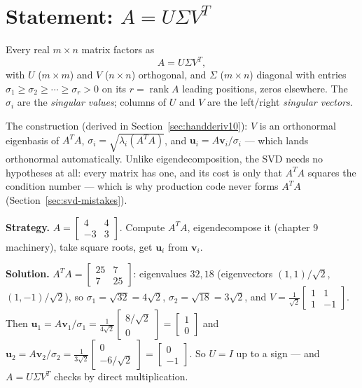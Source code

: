 \section{Statement: \texorpdfstring{$A=U\Sigma V^{T}$}{A=USV^T}}\label{sec:svd-statement}

\begin{theorem}
Every real $m\times n$ matrix factors as
\[
A=U\Sigma V^{T},
\]
with $U$ ($m\times m$) and $V$ ($n\times n$) orthogonal, and $\Sigma$
($m\times n$) diagonal with entries
$\sigma_1\ge\sigma_2\ge\cdots\ge\sigma_r>0$ on its $r=\operatorname{rank}A$
leading positions, zeros elsewhere. The $\sigma_i$ are the
\emph{singular values}; columns of $U$ and $V$ are
the left/right \emph{singular vectors}.
\end{theorem}

The construction (derived in Section~\ref{sec:handderiv10}): $V$ is an
orthonormal eigenbasis of $A^{T}A$, $\sigma_i=\sqrt{\lambda_i(A^{T}A)}$,
and $\mathbf u_i=A\mathbf v_i/\sigma_i$ --- which lands orthonormal
automatically. Unlike eigendecomposition, the SVD needs no hypotheses at
all: every matrix has one, and its cost is only that $A^{T}A$ squares the
condition number --- which is why production code never forms $A^{T}A$
(Section~\ref{sec:svd-mistakes}).

\begin{example}\label{ex:svd2}
\textbf{Strategy.} $A=\begin{bmatrix}4&4\\-3&3\end{bmatrix}$. Compute
$A^{T}A$, eigendecompose it (chapter 9 machinery), take square roots,
get $\mathbf u_i$ from $\mathbf v_i$.

\textbf{Solution.}
$A^{T}A=\begin{bmatrix}25&7\\7&25\end{bmatrix}$: eigenvalues $32,18$
(eigenvectors $(1,1)/\sqrt2$, $(1,-1)/\sqrt2$), so
$\sigma_1=\sqrt{32}=4\sqrt2$, $\sigma_2=\sqrt{18}=3\sqrt2$, and
$V=\frac1{\sqrt2}\begin{bmatrix}1&1\\1&-1\end{bmatrix}$. Then
$\mathbf u_1=A\mathbf v_1/\sigma_1
=\frac{1}{4\sqrt2}\begin{bmatrix}8/\sqrt2\\0\end{bmatrix}
=\begin{bmatrix}1\\0\end{bmatrix}$ and
$\mathbf u_2=A\mathbf v_2/\sigma_2
=\frac{1}{3\sqrt2}\begin{bmatrix}0\\-6/\sqrt2\end{bmatrix}
=\begin{bmatrix}0\\-1\end{bmatrix}$. So $U=I$ up to a sign --- and
$A=U\Sigma V^{T}$ checks by direct multiplication.
\end{example}

